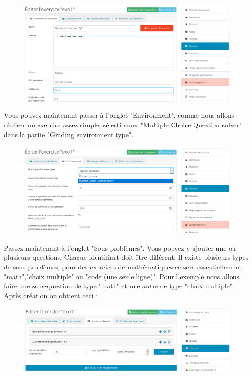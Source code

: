 \documentclass{article}
\begin{document}
\begin{figure}[!htb]
    \centering
    \includegraphics[scale=0.4]{images/Para.PNG}
\end{figure}

\newpage
Vous pouvez maintenant passer à l'onglet "Environment", comme nous allons réaliser un exercice assez simple, sélectionnez "Multiple Choice Question solver" dans la partie "Grading environment type". 

\begin{figure}[!htb]
    \centering
    \includegraphics[scale=0.49]{images/Envi.png}
\end{figure}

Passez maintenant à l'onglet "Sous-problèmes". Vous pouvez y ajouter une ou plusieurs questions. Chaque identifiant doit être différent. Il existe plusieurs types de sous-problèmes, pour des exercices de mathématiques ce sera essentiellement "math","choix multiple" ou "code (une seule ligne)". Pour l'exemple nous allons faire une sous-question de type "math" et une autre de type "choix multiple". Après création on obtient ceci :

\begin{figure}[!htb]
    \centering
    \includegraphics[scale=0.5]{images/sous_prob.png}
\end{figure}
\end{document}
